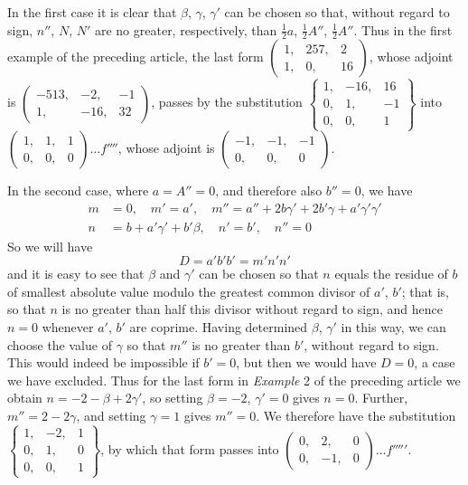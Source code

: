 In the first case it is clear that \(\beta\), \(\gamma\), \(\gamma'\) can be chosen so that, without regard to sign, \(n''\), \(N\), \(N'\) are no greater, respectively, than \(\frac{1}{2}a\), \(\frac{1}{2}A''\), \(\frac{1}{2}A''\). Thus in the first example of the preceding article, the last form \(\left(\begin{smallmatrix}1,&257,&2\\1,&0,&16\end{smallmatrix}\right)\), whose adjoint is \(\left(\begin{smallmatrix}-513,&-2,&-1\\1,&-16,&32\end{smallmatrix}\right)\), passes by the substitution \(\left\{\begin{smallmatrix}1,&-16,&16\\0,&1,&-1\\0,&0,&1\end{smallmatrix}\right\}\) into \(\left(\begin{smallmatrix}1,&1,&1\\0,&0,&0\end{smallmatrix}\right)\ldots f''''\), whose adjoint is \(\left(\begin{smallmatrix}-1,&-1,&-1\\0,&0,&0\end{smallmatrix}\right)\).

In the second case, where \(a=A''=0\), and therefore also \(b''=0\), we have
\[
\begin{aligned}
m&=0,\quad m'=a',\quad m''=a''+2b\gamma'+2b'\gamma+a'\gamma'\gamma'\\
n&=b+a'\gamma'+b'\beta,\quad n'=b',\quad n''=0
\end{aligned}
\]
So we will have
\[
D=a'b'b'=m'n'n'
\]
and it is easy to see that \(\beta\) and \(\gamma'\) can be chosen so that \(n\) equals the residue of \(b\) of smallest absolute value modulo the greatest common divisor
of \(a'\), \(b'\); that is, so that \(n\) is no greater than half this divisor without regard to sign, and hence \(n=0\) whenever \(a'\), \(b'\) are coprime. Having determined \(\beta\), \(\gamma'\) in this way, we can choose the value of \(\gamma\) so that \(m''\) is no greater than \(b'\), without regard to sign. This would indeed be impossible if \(b'=0\), but then we would have \(D=0\), a case we have excluded. Thus for the last form in \emph{Example} 2 of the preceding article we obtain \(n=-2-\beta+2\gamma'\), so setting \(\beta=-2\), \(\gamma'=0\) gives \(n=0\). Further, \(m''=2-2\gamma\), and setting \(\gamma=1\) gives \(m''=0\). We therefore have the substitution \(\left\{\begin{smallmatrix}1,&-2,&1\\0,&1,&0\\0,&0,&1\end{smallmatrix}\right\}\), by which that form passes into \(\left(\begin{smallmatrix}0,&2,&0\\0,&-1,&0\end{smallmatrix}\right)\ldots f'''''\).


